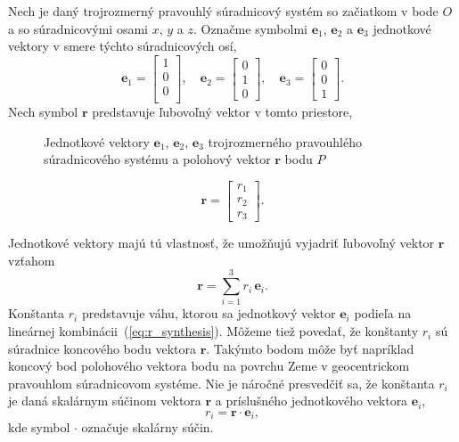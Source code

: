 \documentclass[a4paper, 12pt]{book}
\let\vec\mathbf
\begin{document}
Nech je daný trojrozmerný pravouhlý súradnicový systém so začiatkom v bode $O$ 
a so súradnicovými osami $x$, $y$ a $z$.  Označme symbolmi $\vec e_1$, $\vec 
e_2$ a $\vec e_3$ jednotkové vektory v smere týchto súradnicových osí,
%
\begin{equation}
\vec e_1 =
\begin{bmatrix}
1\\
0\\
0\\
\end{bmatrix}
{,} \quad
%
\vec e_2 =
\begin{bmatrix}
0\\
1\\
0
\end{bmatrix}
%
{,}\quad
%
\vec e_3 =
\begin{bmatrix}
0\\
0\\
1
\end{bmatrix}
{.}
\end{equation}
%
Nech symbol $\vec r$ predstavuje ľubovoľný vektor v tomto priestore,

\begin{figure}
\centering

\caption{Jednotkové vektory $\vec e_1$, $\vec e_2$, $\vec e_3$ trojrozmerného 
pravouhlého súradnicového systému a polohový vektor $\vec r$ bodu $P$}
\label{fig:unit_vectors}
\end{figure}

\begin{equation}
\vec r =
\begin{bmatrix}
r_1\\
r_2\\
r_3
\end{bmatrix}
{.}
\end{equation}

Jednotkové vektory majú tú vlastnosť, že umožňujú vyjadriť ľubovoľný vektor 
$\vec r$ vzťahom
%
\begin{equation}
\label{eq:r_synthesis}
\vec r = \sum_{i = 1}^3 r_i \, \vec e_i{.}
\end{equation}
%
Konštanta $r_i$ predstavuje váhu, ktorou sa jednotkový vektor $\vec e_i$ 
podieľa na lineárnej kombinácii~(\ref{eq:r_synthesis}).  Môžeme tiež povedať, 
že konštanty $r_i$ sú súradnice koncového bodu vektora $\vec r$.  Takýmto bodom 
môže byť napríklad koncový bod polohového vektora bodu na povrchu Zeme 
v geocentrickom pravouhlom súradnicovom systéme.  Nie je náročné presvedčiť sa, 
že konštanta $r_i$ je daná skalárnym súčinom vektora $\vec r$ a príslušného 
jednotkového vektora $\vec e_i$,
%
\begin{equation}
\label{eq:r_analysis}
r_i = \vec r \cdot \vec e_i{,}
\end{equation}
%
kde symbol $\cdot$ označuje skalárny súčin.
\end{document}
